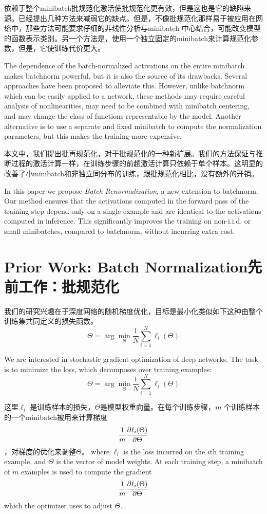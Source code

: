 依赖于整个minibatch批规范化激活使批规范化更有效，但是这也是它的缺陷来源。已经提出几种方法来减弱它的缺点\cite{weightnorm,layernorm,normprop}。但是，不像批规范化那样易于被应用在网络中，那些方法可能要求仔细的非线性分析与minibatch 中心结合，可能改变模型的函数表示类别。另一个方法是\cite{gan}，使用一个独立固定的minibatch来计算规范化参数，但是，它使训练代价更大。

The dependence of the batch-normalized activations on the entire minibatch makes batchnorm powerful, but it is also the source of its drawbacks. Several approaches \cite{weightnorm,layernorm,normprop} have been proposed to alleviate this. However, unlike batchnorm which can be easily applied to a network, these methods may require careful analysis of nonlinearities, may need to be combined with  minibatch centering, and may change the class of functions representable by the model. Another alternative \cite{gan} is to use a separate and fixed minibatch to compute the normalization parameters, but this makes the training more expensive.

本文中，我们提出批再规范化，对于批规范化的一种新扩展。我们的方法保证与推断过程的激活计算一样，在训练步骤的前趟激活计算只依赖于单个样本。这明显的改善了小minibatch和非独立同分布的训练，跟批规范化相比，没有额外的开销。

In this paper we propose {\em Batch Renormalization}, a new extension to batchnorm. Our method ensures that the activations computed in the forward pass of the training step depend only on a single example and are identical to the activations computed in inference. This significantly improves the training on non-i.i.d. or small minibatches, compared to batchnorm, without incurring extra cost.

\section{Prior Work: Batch Normalization先前工作：批规范化}
我们的研究兴趣在于深度网络的随机梯度优化，目标是最小化类似如下这种由整个训练集共同定义的损失函数。
$$\Theta = \arg \min_\Theta
\frac{1}{N}\sum_{i=1}^N \ell_i(\Theta)$$

We are interested in stochastic gradient optimization of deep networks. The task is to minimize the loss, which decomposes over training examples:
$$\Theta = \arg \min_\Theta
\frac{1}{N}\sum_{i=1}^N \ell_i(\Theta)$$

这里$\ell_i$ 是训练样本的损失，$\Theta$是模型权重向量。在每个训练步骤，$m$ 个训练样本的一个minibatch被用来计算梯度$$\frac{1}{m} \frac{\partial  \ell_i(\Theta)}{\partial  \Theta}$$，对梯度的优化来调整$\Theta$。
where $\ell_i$ is the loss incurred on the $i$th training example, and $\Theta$ is the vector of model weights. At each training step, a minibatch of $m$ examples is used to compute the  gradient
$$\frac{1}{m} \frac{\partial  \ell_i(\Theta)}{\partial  \Theta}$$
which the optimizer uses to adjust $\Theta$.

